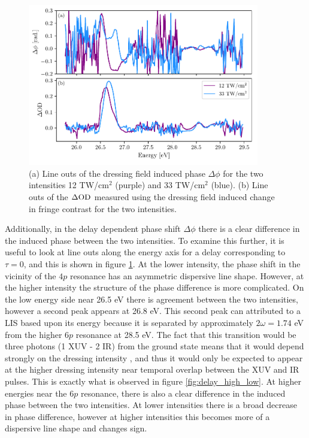 \begin{figure}
	\centering
	\includegraphics[width=0.9\textwidth]{figures/CATS/dphi_dod_lineout.pdf}
	\caption[Line outs of $\Delta\phi$ and $\dod$ for $\tau=0$ using CATS]{(a) Line outs of the dressing field induced phase $\Delta\phi$ for the two intensities 12 TW/cm$^2$ (purple) and 33 TW/cm$^2$ (blue).  (b) Line outs of the $\dod$ measured using the dressing field induced change in fringe contrast for the two intensities.}
	\label{fig:dphi_dod_lineout}
\end{figure}

Additionally, in the delay dependent phase shift $\Delta\phi$ there is a clear difference in the induced phase between the two intensities.  To examine this further, it is useful to look at line outs along the energy axis for a delay corresponding to $\tau=0$, and this is shown in figure \ref{fig:dphi_dod_lineout}.  At the lower intensity, the phase shift in the vicinity of the $4p$ resonance has an asymmetric dispersive line shape.  However, at the higher intensity the structure of the phase difference is more complicated.  On the low energy side near 26.5 eV there is agreement between the two intensities, however a second peak appears at 26.8 eV.  This second peak can attributed to a LIS based upon its energy because it is separated by approximately $2\omega=1.74$  eV from the higher $6p$ resonance at 28.5 eV.  The fact that this transition would be three photons (1 XUV - 2 IR) from the ground state means that it would depend strongly on the dressing intensity \cite{shankarPrinciplesQuantumMechanics2013}, and thus it would only be expected to appear at the higher dressing intensity near temporal overlap between the XUV and IR pulses.  This is exactly what is observed in figure \ref{fig:delay_high_low}. At higher energies near the $6p$ resonance, there is also a clear difference in the induced phase between the two intensities.  At lower intensities there is a broad decrease in phase difference, however at higher intensities this becomes more of a dispersive line shape and changes sign.


